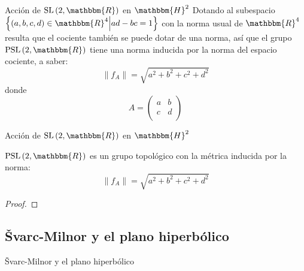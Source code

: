 \documentclass[xcolor=dvipsnames]{beamer}
\theoremstyle{largebreak}
\newcommand{\bbm}[1]{\ensuremath{\mathbbm{#1}}}
\newcommand{\norm}[1]{\|#1\|}
\newcommand{\SL}[1]{\ensuremath{\textup{SL}\left(#1\right)}}
\newcommand{\PSL}[1]{\ensuremath{\textup{PSL}\left(#1\right)}}
\begin{document}
\begin{frame}{Acción de $\SL{2,\bbm{R}}$ en $\bbm{H}^2$}
    Dotando al subespacio $\left\{(a,b,c,d)\in\bbm{R}^4\Big|ad-bc=1 \right\}$ con la norma usual de $\bbm{R}^4$ resulta que el cociente también se puede dotar de una norma, así que el grupo $\PSL{2,\bbm{R}}$ tiene una norma inducida por la norma del espacio cociente, a saber:
    \begin{equation*}
        \norm{f_A}=\sqrt{a^2+b^2+c^2+d^2}
    \end{equation*}
    donde
    \begin{equation*}
        A=\left(\begin{array}{cc}
            a & b \\
            c & d \\
        \end{array}\right)
    \end{equation*}
\end{frame}

\begin{frame}{Acción de $\SL{2,\bbm{R}}$ en $\bbm{H}^2$}
    \begin{propo}
        $\PSL{2,\bbm{R}}$ es un grupo topológico con la métrica inducida por la norma:
        \begin{equation*}
            \norm{f_A}=\sqrt{a^2+b^2+c^2+d^2}
        \end{equation*}
    \end{propo}

    \begin{proof}
    \end{proof}
\end{frame}

\subsection{Švarc-Milnor y el plano hiperbólico}

\begin{frame}
    \begin{center}
        Švarc-Milnor y el plano hiperbólico
    \end{center}
\end{frame}
\end{document}

